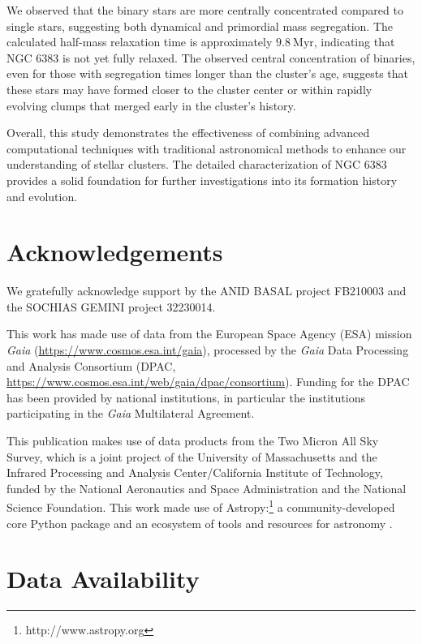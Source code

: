 \documentclass[fleqn,usenatbib,usedcolumn,useAMS]{mnras}
\begin{document}
We observed that the binary stars are more centrally concentrated compared to single stars, suggesting both dynamical and primordial mass segregation. The calculated half-mass relaxation time is approximately $9.8~\mathrm{Myr}$, indicating that NGC 6383 is not yet fully relaxed. The observed central concentration of binaries, even for those with segregation times longer than the cluster's age, suggests that these stars may have formed closer to the cluster center or within rapidly evolving clumps that merged early in the cluster's history.

Overall, this study demonstrates the effectiveness of combining advanced computational techniques with traditional astronomical methods to enhance our understanding of stellar clusters. The detailed characterization of NGC 6383 provides a solid foundation for further investigations into its formation history and evolution.

\section*{Acknowledgements}

We gratefully acknowledge support by the ANID BASAL project FB210003 and the SOCHIAS GEMINI project 32230014.

This work has made use of data from the European Space Agency (ESA) mission {\it Gaia} (\url{https://www.cosmos.esa.int/gaia}), processed by the {\it Gaia} Data Processing and Analysis Consortium (DPAC, \url{https://www.cosmos.esa.int/web/gaia/dpac/consortium}). Funding for the DPAC has been provided by national institutions, in particular the institutions participating in the {\it Gaia} Multilateral Agreement. 

This publication makes use of data products from the Two Micron All Sky Survey, which is a joint project of the University of Massachusetts and the Infrared Processing and Analysis Center/California Institute of Technology, funded by the National Aeronautics and Space Administration and the National Science Foundation. This work made use of Astropy:\footnote{http://www.astropy.org} a community-developed core Python package and an ecosystem of tools and resources for astronomy \citep{astropy:2013, astropy:2018, astropy:2022}.

\section*{Data Availability}


 
\end{document}
